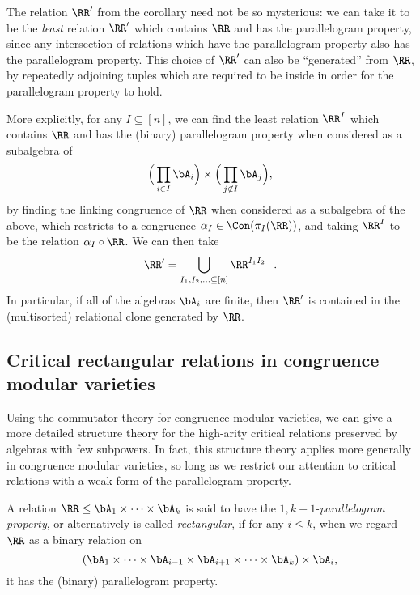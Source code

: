 The relation $\RR'$ from the corollary need not be so mysterious: we can take it to be the \emph{least} relation $\RR'$ which contains $\RR$ and has the parallelogram property, since any intersection of relations which have the parallelogram property also has the parallelogram property. This choice of $\RR'$ can also be ``generated'' from $\RR$, by repeatedly adjoining tuples which are required to be inside in order for the parallelogram property to hold.

More explicitly, for any $I \subseteq [n]$, we can find the least relation $\RR^I$ which contains $\RR$ and has the (binary) parallelogram property when considered as a subalgebra of
\[
\Big(\prod_{i \in I} \bA_i\Big) \times \Big(\prod_{j \not\in I} \bA_{j}\Big),
\]
by finding the linking congruence of $\RR$ when considered as a subalgebra of the above, which restricts to a congruence $\alpha_I \in \Con(\pi_I(\RR))$, and taking $\RR^I$ to be the relation $\alpha_I \circ \RR$. We can then take
\[
\RR' = \bigcup_{I_1, I_2, ... \subseteq [n]} \RR^{I_1I_2\cdots}.
\]
In particular, if all of the algebras $\bA_i$ are finite, then $\RR'$ is contained in the (multisorted) relational clone generated by $\RR$.%


\subsection{Critical rectangular relations in congruence modular varieties}

Using the commutator theory for congruence modular varieties, we can give a more detailed structure theory for the high-arity critical relations preserved by algebras with few subpowers. In fact, this structure theory applies more generally in congruence modular varieties, so long as we restrict our attention to critical relations with a weak form of the parallelogram property.

\begin{defn} A relation $\RR \le \bA_1 \times \cdots \times \bA_k$ is said to have the $1,k-1$-\emph{parallelogram property}, or alternatively is called \emph{rectangular}, if for any $i \le k$, when we regard $\RR$ as a binary relation on
\[
(\bA_1 \times \cdots \times \bA_{i-1} \times \bA_{i+1} \times \cdots \times \bA_k) \times \bA_i,
\]
it has the (binary) parallelogram property.
\end{defn}

